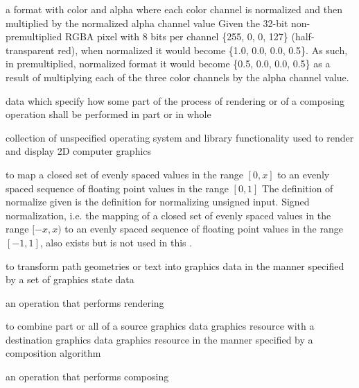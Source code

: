 a format with color and alpha where each color channel is normalized and then 
multiplied by the normalized alpha channel value
\enterexample
Given the 32-bit non-premultiplied RGBA pixel with 8 bits per channel \{255, 0, 
0, 127\} (half-transparent red), when normalized it would become \{1.0, 0.0, 
0.0, 0.5\}. As such, in premultiplied, normalized format it would become \{0.5, 
0.0, 0.0, 0.5\} as a result of multiplying each of the three color channels by 
the alpha channel value.
\exitexample

data which specify how some part of the process of rendering or of a composing operation shall be performed in part or in whole

collection of unspecified operating system and library functionality used to render and display 2D computer graphics

to map a closed set of evenly spaced values in the range $[0, x]$ to an evenly spaced sequence of floating point values in the range $[0, 1]$
\enternote
The definition of normalize given is the definition for normalizing unsigned input. Signed normalization, i.e. the mapping of a closed set of evenly spaced values in the range $[-x, x)$ to an evenly spaced sequence of floating point values in the range $[-1, 1]$, also exists but is not used in this \documenttypename{}.
\exitnote

to transform path geometries or text into graphics data in the manner specified by a set of graphics state data

an operation that performs rendering

to combine part or all of a source graphics data graphics resource with a destination graphics data graphics resource in the manner specified by a composition algorithm

an operation that performs composing

